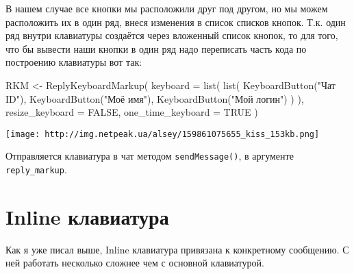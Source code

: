 \documentclass[
]{book}
\newenvironment{Shaded}{\begin{snugshade}}{\end{snugshade}}
\newcommand{\AttributeTok}[1]{\textcolor[rgb]{0.77,0.63,0.00}{#1}}
\newcommand{\ConstantTok}[1]{\textcolor[rgb]{0.00,0.00,0.00}{#1}}
\newcommand{\FunctionTok}[1]{\textcolor[rgb]{0.00,0.00,0.00}{#1}}
\newcommand{\NormalTok}[1]{#1}
\newcommand{\OtherTok}[1]{\textcolor[rgb]{0.56,0.35,0.01}{#1}}
\newcommand{\SpecialCharTok}[1]{\textcolor[rgb]{0.00,0.00,0.00}{#1}}
\newcommand{\StringTok}[1]{\textcolor[rgb]{0.31,0.60,0.02}{#1}}
\begin{document}
В нашем случае все кнопки мы расположили друг под другом, но мы можем расположить их в один ряд, внеся изменения в список списков кнопок. Т.к. один ряд внутри клавиатуры создаётся через вложенный список кнопок, то для того, что бы вывести наши кнопки в один ряд надо переписать часть кода по построению клавиатуры вот так:

\begin{Shaded}
\begin{Highlighting}[]
\NormalTok{RKM }\OtherTok{\textless{}{-}} \FunctionTok{ReplyKeyboardMarkup}\NormalTok{(}
    \AttributeTok{keyboard =} \FunctionTok{list}\NormalTok{(}
      \FunctionTok{list}\NormalTok{(}
          \FunctionTok{KeyboardButton}\NormalTok{(}\StringTok{"Чат ID"}\NormalTok{),}
          \FunctionTok{KeyboardButton}\NormalTok{(}\StringTok{"Моё имя"}\NormalTok{),}
          \FunctionTok{KeyboardButton}\NormalTok{(}\StringTok{"Мой логин"}\NormalTok{)}
\NormalTok{     )}
\NormalTok{    ),}
    \AttributeTok{resize\_keyboard =} \ConstantTok{FALSE}\NormalTok{,}
    \AttributeTok{one\_time\_keyboard =} \ConstantTok{TRUE}
\NormalTok{)}
\end{Highlighting}
\end{Shaded}

\texttt{[image: http://img.netpeak.ua/alsey/159861075655\_kiss\_153kb.png]}

Отправляется клавиатура в чат методом \texttt{sendMessage()}, в аргументе \texttt{reply\_markup}.

\begin{Shaded}
\end{Shaded}

\hypertarget{inline-ux43aux43bux430ux432ux438ux430ux442ux443ux440ux430}{%
\section{Inline клавиатура}\label{inline-ux43aux43bux430ux432ux438ux430ux442ux443ux440ux430}}

Как я уже писал выше, Inline клавиатура привязана к конкретному сообщению. С ней работать несколько сложнее чем с основной клавиатурой.
\end{document}
